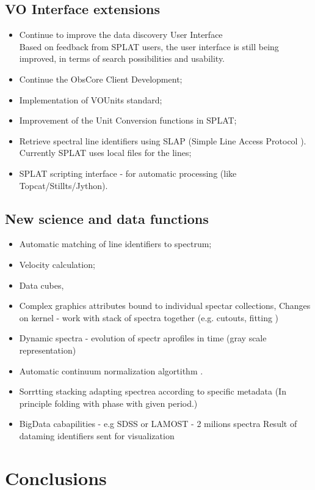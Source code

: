 \documentclass[final,authoryear,5p,times,twocolumn]{elsarticle}
\begin{document}
\subsection{VO Interface extensions}
\begin{itemize}
\item Continue to improve the data discovery User Interface\\
Based on feedback from SPLAT users, the user interface is still being improved, in terms of search possibilities and usability. 
\item Continue the ObsCore Client Development;
\item Implementation of  VOUnits \cite{vounits} standard;
\item	Improvement of the Unit Conversion functions in SPLAT;\\
\item Retrieve spectral line identifiers using SLAP (Simple Line Access Protocol \cite{slap}). Currently SPLAT uses local files for the lines;
\item  SPLAT scripting interface - for automatic processing (like Topcat/Stillts/Jython).
\end{itemize}

\subsection{New science and data functions}
\begin{itemize}
\item Automatic matching of line identifiers to spectrum;
\item	Velocity calculation;
\item Data cubes, 
\item Complex graphics attributes bound to individual spectar collections, Changes on kernel - work with stack of spectra together (e.g. cutouts, fitting )
\item Dynamic spectra - evolution of spectr aprofiles in time (gray scale representation)
\item Automatic continuum normalization algortithm .
\item Sorrtting stacking adapting spectrea according to specific metadata (In principle folding with phase with given period.)
\item BigData cabapilities - e.g SDSS or LAMOST - 2 milions spectra Result of dataming identifiers sent for visualization
\end{itemize}

\section{Conclusions}
\end{document}
